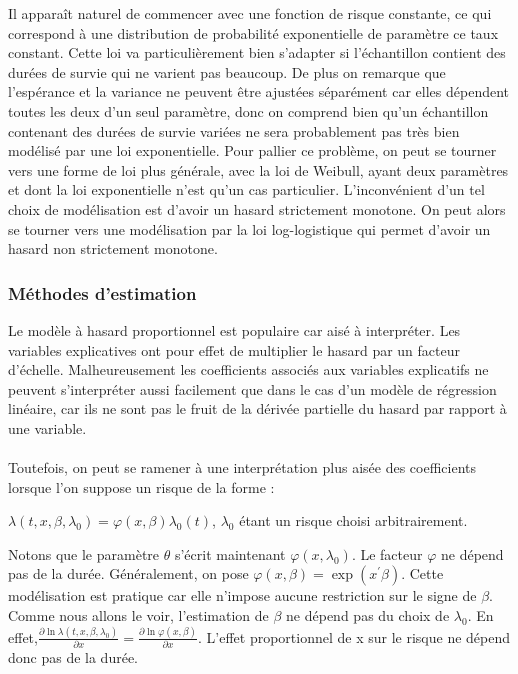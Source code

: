 \documentclass[12pt,a4paper]{article}
\begin{document}
Il apparaît naturel de commencer avec une fonction de risque constante, ce qui correspond à une distribution de probabilité exponentielle de paramètre ce taux constant. Cette loi va particulièrement bien s’adapter si l’échantillon contient des durées de survie qui ne varient pas beaucoup. De plus on remarque que l’espérance et la variance ne peuvent être ajustées séparément car elles dépendent toutes les deux d’un seul paramètre, donc on comprend bien qu’un échantillon contenant des durées de survie variées ne sera probablement pas très bien modélisé par une loi exponentielle. Pour pallier ce problème, on peut se tourner vers une forme de loi plus générale, avec la loi de Weibull, ayant deux paramètres et dont la loi exponentielle n’est qu’un cas particulier. L’inconvénient d’un tel choix de modélisation est d’avoir un hasard strictement monotone. On peut alors se tourner vers une modélisation par la loi log-logistique qui permet d’avoir un hasard non strictement monotone.

\subsubsection{Méthodes d'estimation}


Le modèle à hasard proportionnel est populaire car aisé à interpréter. Les variables explicatives ont pour effet de multiplier le hasard par un facteur d’échelle. Malheureusement les coefficients associés aux variables explicatifs ne peuvent s’interpréter aussi facilement que dans le cas d’un modèle de régression linéaire, car ils ne sont pas le fruit de la dérivée partielle du hasard par rapport à une variable. 

\paragraph{}

Toutefois, on peut se ramener à une interprétation plus aisée des coefficients lorsque l’on suppose un risque de la forme : 

$\lambda\left(t,x,\beta,\lambda_{0}\right)=\varphi\left(x,\beta\right)\lambda_{0}\left(t\right)$, $\lambda_{0}$ étant un risque choisi arbitrairement.

Notons que le paramètre $\theta$ s’écrit maintenant $\varphi\left(x,\lambda_{0}\right)$. Le facteur $\varphi$ ne dépend pas de la durée. Généralement, on pose $\varphi\left(x,\beta\right)=\exp\left(x^{'}\beta\right)$. Cette modélisation est pratique car elle n’impose aucune restriction sur le signe de $\beta$. Comme nous allons le voir, l’estimation de $\beta$ ne dépend pas du choix de $\lambda_{0}$. En effet,$\frac{\partial\ln\lambda\left(t,x,\beta,\lambda_{0}\right)}{\partial x}=\frac{\partial\ln\varphi\left(x,\beta\right)}{\partial x}$. L’effet proportionnel de x sur le risque ne dépend donc pas de la durée.
\end{document}
